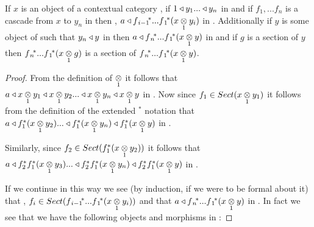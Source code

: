 \begin{lemma}
If $x$ is an object of a contextual category \catc, if $1 \base y_1 ... \base y_n$ in \catcw and if $f_1,...f_n$ is a cascade from $x$ to $y_n$ in  \catcw then \foreachi, $a \base \fipvectorstar(\crossx{x}{y_i}{1})$ in \catc.
Additionally if $y$ is some object of \catcw such that $y_n \base y$ in \catcw then 
 $a \base \fnvectorstar(\crossx{x}{y}{1})$ in \catcw and
if $g$ is a section of $y$ then $\fnvectorstar(\crossx{x}{g}{1})$ is a section of $\fnvectorstar(\crossx{x}{y}{1})$.
\end{lemma}
\begin{proof}
From the definition of $\crossx{}{}{1}$ it follows that $a \base \crossx{x}{y_1}{1} \base \crossx{x}{y_2}{1} ... \base \crossx{x}{y_n}{1} \base \crossx{x}{y}{1}$ in \catc. Now since $f_1 \in Sect(\crossx{x}{y_1}{1})$ it follows from the definition of the extended $^*$ notation
that $a \base f_1^*(\crossx{x}{y_2}{1})  ... \base f_1^*(\crossx{x}{y_n}{1}) \base f_1^*(\crossx{x}{y}{1})$ in \catc.

Similarly, since $f_2 \in Sect(f_1^*(\crossx{x}{y_2}{1}))$ it follows 
that $a \base f_2^*f_1^*(\crossx{x}{y_3}{1})  ... \base f_2^*f_1^*(\crossx{x}{y_n}{1}) \base f_2^*f_1^*(\crossx{x}{y}{1})$ in \catc.

If we continue in this way we see (by induction,  if we were to be formal about it) that \foreachi, $f_i \in Sect(\fipvectorstar(\crossx{x}{y_i}{1}))$
and that $a \base \fnvectorstar(\crossx{x}{y}{1})$ in \catc. In fact we see that
we have the following objects and morphisms in \catc:


\end{proof}
